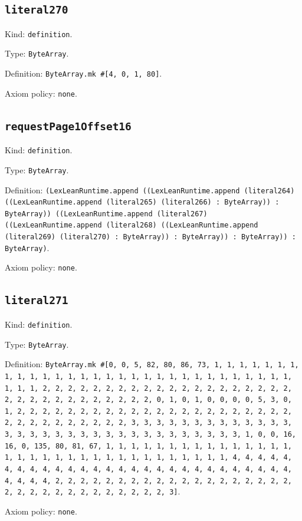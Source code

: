 \documentclass[11pt]{article}
\begin{document}
\subsection*{\texttt{literal270}}
\noindent Kind: \texttt{definition}.\par
\noindent Type: \texttt{ByteArray}.\par
\noindent Definition: \texttt{ByteArray.mk \#[4, 0, 1, 80]}.\par
\noindent Axiom policy: \texttt{none}.\par
\subsection*{\texttt{requestPage1Offset16}}
\noindent Kind: \texttt{definition}.\par
\noindent Type: \texttt{ByteArray}.\par
\noindent Definition: \texttt{(LexLeanRuntime.append ((LexLeanRuntime.append (literal264) ((LexLeanRuntime.append (literal265) (literal266) : ByteArray)) : ByteArray)) ((LexLeanRuntime.append (literal267) ((LexLeanRuntime.append (literal268) ((LexLeanRuntime.append (literal269) (literal270) : ByteArray)) : ByteArray)) : ByteArray)) : ByteArray)}.\par
\noindent Axiom policy: \texttt{none}.\par
\subsection*{\texttt{literal271}}
\noindent Kind: \texttt{definition}.\par
\noindent Type: \texttt{ByteArray}.\par
\noindent Definition: \texttt{ByteArray.mk \#[0, 0, 5, 82, 80, 86, 73, 1, 1, 1, 1, 1, 1, 1, 1, 1, 1, 1, 1, 1, 1, 1, 1, 1, 1, 1, 1, 1, 1, 1, 1, 1, 1, 1, 1, 1, 1, 1, 1, 1, 2, 2, 2, 2, 2, 2, 2, 2, 2, 2, 2, 2, 2, 2, 2, 2, 2, 2, 2, 2, 2, 2, 2, 2, 2, 2, 2, 2, 2, 2, 2, 2, 0, 1, 0, 1, 0, 0, 0, 0, 5, 3, 0, 1, 2, 2, 2, 2, 2, 2, 2, 2, 2, 2, 2, 2, 2, 2, 2, 2, 2, 2, 2, 2, 2, 2, 2, 2, 2, 2, 2, 2, 2, 2, 2, 2, 3, 3, 3, 3, 3, 3, 3, 3, 3, 3, 3, 3, 3, 3, 3, 3, 3, 3, 3, 3, 3, 3, 3, 3, 3, 3, 3, 3, 3, 3, 3, 3, 1, 0, 0, 16, 16, 0, 135, 80, 81, 67, 1, 1, 1, 1, 1, 1, 1, 1, 1, 1, 1, 1, 1, 1, 1, 1, 1, 1, 1, 1, 1, 1, 1, 1, 1, 1, 1, 1, 1, 1, 1, 1, 1, 4, 4, 4, 4, 4, 4, 4, 4, 4, 4, 4, 4, 4, 4, 4, 4, 4, 4, 4, 4, 4, 4, 4, 4, 4, 4, 4, 4, 4, 4, 4, 4, 2, 2, 2, 2, 2, 2, 2, 2, 2, 2, 2, 2, 2, 2, 2, 2, 2, 2, 2, 2, 2, 2, 2, 2, 2, 2, 2, 2, 2, 2, 2, 2, 3]}.\par
\noindent Axiom policy: \texttt{none}.\par
\end{document}
